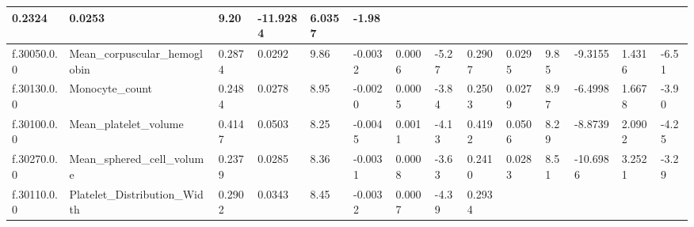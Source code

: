 \begin{longtable}{llllllllllllll}
  \multicolumn{1}{l|}{0.2324} &
  \multicolumn{1}{l|}{0.0253} &
  \multicolumn{1}{l|}{9.20} &
  \multicolumn{1}{l|}{-11.9284} &
  \multicolumn{1}{l|}{6.0357} &
  \multicolumn{1}{l|}{-1.98} \\ \hline
\multicolumn{1}{|l|}{f.30050.0.0} &
  \multicolumn{1}{l|}{Mean\_corpuscular\_hemoglobin} &
  \multicolumn{1}{l|}{0.2874} &
  \multicolumn{1}{l|}{0.0292} &
  \multicolumn{1}{l|}{9.86} &
  \multicolumn{1}{l|}{-0.0032} &
  \multicolumn{1}{l|}{0.0006} &
  \multicolumn{1}{l|}{-5.27} &
  \multicolumn{1}{l|}{0.2907} &
  \multicolumn{1}{l|}{0.0295} &
  \multicolumn{1}{l|}{9.85} &
  \multicolumn{1}{l|}{-9.3155} &
  \multicolumn{1}{l|}{1.4316} &
  \multicolumn{1}{l|}{-6.51} \\ \hline
\multicolumn{1}{|l|}{f.30130.0.0} &
  \multicolumn{1}{l|}{Monocyte\_count} &
  \multicolumn{1}{l|}{0.2484} &
  \multicolumn{1}{l|}{0.0278} &
  \multicolumn{1}{l|}{8.95} &
  \multicolumn{1}{l|}{-0.0020} &
  \multicolumn{1}{l|}{0.0005} &
  \multicolumn{1}{l|}{-3.84} &
  \multicolumn{1}{l|}{0.2503} &
  \multicolumn{1}{l|}{0.0279} &
  \multicolumn{1}{l|}{8.97} &
  \multicolumn{1}{l|}{-6.4998} &
  \multicolumn{1}{l|}{1.6678} &
  \multicolumn{1}{l|}{-3.90} \\ \hline
\multicolumn{1}{|l|}{f.30100.0.0} &
  \multicolumn{1}{l|}{Mean\_platelet\_volume} &
  \multicolumn{1}{l|}{0.4147} &
  \multicolumn{1}{l|}{0.0503} &
  \multicolumn{1}{l|}{8.25} &
  \multicolumn{1}{l|}{-0.0045} &
  \multicolumn{1}{l|}{0.0011} &
  \multicolumn{1}{l|}{-4.13} &
  \multicolumn{1}{l|}{0.4192} &
  \multicolumn{1}{l|}{0.0506} &
  \multicolumn{1}{l|}{8.29} &
  \multicolumn{1}{l|}{-8.8739} &
  \multicolumn{1}{l|}{2.0902} &
  \multicolumn{1}{l|}{-4.25} \\ \hline
\multicolumn{1}{|l|}{f.30270.0.0} &
  \multicolumn{1}{l|}{Mean\_sphered\_cell\_volume} &
  \multicolumn{1}{l|}{0.2379} &
  \multicolumn{1}{l|}{0.0285} &
  \multicolumn{1}{l|}{8.36} &
  \multicolumn{1}{l|}{-0.0031} &
  \multicolumn{1}{l|}{0.0008} &
  \multicolumn{1}{l|}{-3.63} &
  \multicolumn{1}{l|}{0.2410} &
  \multicolumn{1}{l|}{0.0283} &
  \multicolumn{1}{l|}{8.51} &
  \multicolumn{1}{l|}{-10.6986} &
  \multicolumn{1}{l|}{3.2521} &
  \multicolumn{1}{l|}{-3.29} \\ \hline
\multicolumn{1}{|l|}{f.30110.0.0} &
  \multicolumn{1}{l|}{Platelet\_Distribution\_Width} &
  \multicolumn{1}{l|}{0.2902} &
  \multicolumn{1}{l|}{0.0343} &
  \multicolumn{1}{l|}{8.45} &
  \multicolumn{1}{l|}{-0.0032} &
  \multicolumn{1}{l|}{0.0007} &
  \multicolumn{1}{l|}{-4.39} &
  \multicolumn{1}{l|}{0.2934} &

\end{longtable}
